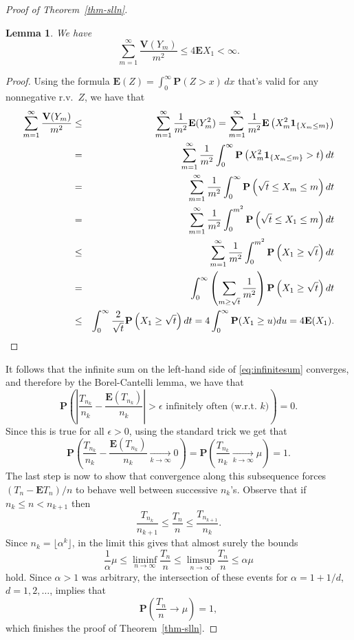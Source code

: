 \documentclass[12pt]{article}
\newtheorem{lemma}[thm]{Lemma}
\newtheorem{exercise}[thm]{Exercise}
\newcommand{\prob}{\mathbf{P}}
\newcommand{\expec}{\mathbf{E}}
\newcommand{\var}{\mathbf{V}}
\newcommand{\ind}{\textbf{1}}
\theoremstyle{example}
\begin{document}
\begin{proof}[Proof of Theorem~\ref{thm-slln}]
\begin{lemma} We have $$\sum_{m=1}^\infty \frac{\var(Y_m)}{m^2} \le 4 \expec X_1 < \infty.$$
\end{lemma}


\begin{proof}
Using the formula $\expec(Z)=\int_0^\infty \prob(Z>x)\,dx$ that's valid for any nonnegative r.v.\ $Z$, we have that
\begin{eqnarray*}
\sum_{m=1}^\infty \frac{\var(Y_m)}{m^2} &\le& \sum_{m=1}^\infty \frac{1}{m^2} \expec(Y_m^2)
=\sum_{m=1}^\infty \frac{1}{m^2}\expec\left(X_m^2 \ind_{\{X_m\le m\}}\right)
\\ &=& \sum_{m=1}^\infty \frac{1}{m^2} \int_0^\infty \prob\left(X_m^2 \ind_{\{X_m\le m\}}>t\right)dt
\\ &=& \sum_{m=1}^\infty \frac{1}{m^2} \int_0^\infty \prob\left(\sqrt{t} \le X_m \le m \right)dt
\\ &=& \sum_{m=1}^\infty \frac{1}{m^2} \int_0^{m^2} \prob\left(\sqrt{t} \le X_1 \le m \right)dt
\\ &\le& \sum_{m=1}^\infty \frac{1}{m^2} \int_0^{m^2} \prob\left(X_1 \ge \sqrt{t} \right)dt
\\ &=& \int_0^\infty \left(\sum_{m\ge \sqrt{t}} \frac{1}{m^2}\right) \prob\left(X_1\ge \sqrt{t}\right)dt
\\ &\le& \int_0^\infty \frac{2}{\sqrt{t}} \prob\left(X_1\ge \sqrt{t}\right)dt = 4 \int_0^\infty \prob(X_1\ge u)du = 4\expec(X_1).
\qedhere
\end{eqnarray*}
\end{proof}


It follows that the infinite sum on the left-hand side of \eqref{eq:infinitesum} converges, and therefore by the Borel-Cantelli lemma, we have that
$$ 
\prob\left(\left|\frac{T_{n_k}}{n_k} - \frac{\expec(T_{n_k})}{n_k}\right| > \epsilon\textrm{ infinitely often (w.r.t.\ $k$)}\right)
=0.
$$
Since this is true for all $\epsilon>0$, using the standard trick we get that
$$ \prob\left(\frac{T_{n_k}}{n_k} - \frac{\expec(T_{n_k})}{n_k}\xrightarrow[k\to\infty]{}0\right) = 
\prob\left(\frac{T_{n_k}}{n_k}  \xrightarrow[k\to\infty]{}\mu\right) =  1.$$
The last step is now to show that convergence along this subsequence forces $(T_n-\expec T_n)/n$ to behave well between successive $n_k$'s. Observe that if $n_k \le n < n_{k+1}$ then
$$ \frac{T_{n_k}}{n_{k+1}} \le \frac{T_n}{n} \le \frac{T_{n_{k+1}}}{n_k}. $$
Since $n_k=\lfloor \alpha^k\rfloor$, in the limit this gives that almost surely the bounds
$$ \frac{1}{\alpha} \mu \le \liminf_{n\to\infty} \frac{T_n}{n} \le \limsup_{n\to\infty} \frac{T_n}{n}
\le \alpha \mu $$
hold. Since $\alpha>1$ was arbitrary, the intersection of these events for $\alpha=1+1/d$, $d=1,2,\ldots$, implies that
$$ \prob\left( \frac{T_n}{n} \to\mu \right) = 1, $$
which finishes the proof of Theorem~\ref{thm-slln}.
\end{proof}
\end{document}
